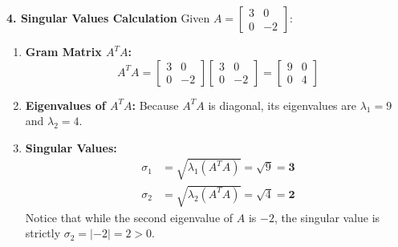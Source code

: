 \textbf{4. Singular Values Calculation}
Given $A = \begin{bmatrix} 3 & 0 \\ 0 & -2 \end{bmatrix}$:
\begin{enumerate}
    \item \textbf{Gram Matrix $A^T A$:}
    \begin{equation*}
    A^T A = \begin{bmatrix} 3 & 0 \\ 0 & -2 \end{bmatrix} \begin{bmatrix} 3 & 0 \\ 0 & -2 \end{bmatrix} = \begin{bmatrix} 9 & 0 \\ 0 & 4 \end{bmatrix}
    \end{equation*}
    \item \textbf{Eigenvalues of $A^T A$:}
    Because $A^T A$ is diagonal, its eigenvalues are $\lambda_1 = 9$ and $\lambda_2 = 4$.
    \item \textbf{Singular Values:}
    \begin{align*}
    \sigma_1 &= \sqrt{\lambda_1(A^T A)} = \sqrt{9} = \mathbf{3} \\
    \sigma_2 &= \sqrt{\lambda_2(A^T A)} = \sqrt{4} = \mathbf{2}
    \end{align*}
    Notice that while the second eigenvalue of $A$ is $-2$, the singular value is strictly $\sigma_2 = |-2| = 2 > 0$.
\end{enumerate}

